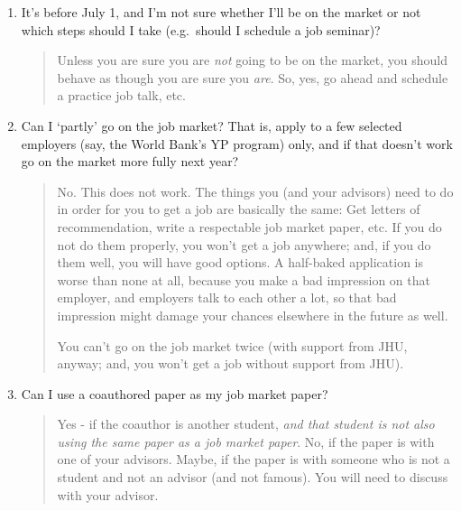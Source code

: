\documentclass{\classes/econtex}
\begin{document}
\begin{enumerate}
\begin{quote}
\begin{comment}
    \end{comment}


  \end{quote}
\item It's before July 1, and I'm not sure whether I'll be on the market or not which steps should I take (e.g.\ should I schedule a job seminar)?

  \begin{quote}
    Unless you are sure you are \textit{not} going to be on the market, you should behave as though you are sure you \textit{are}.  So, yes, go ahead and schedule a practice job talk, etc.

  \end{quote}
\item  Can I `partly' go on the job market?  That is, apply to a few
  selected employers (say, the World Bank's YP program) only, and 
  if that doesn't work go on the market more fully next year?

  \begin{quote}
    No.  This does not work.  The things you (and your advisors) need to do in order for you to
    get a job are basically the same: Get letters of recommendation, 
    write a respectable job market paper, etc.  If you do not do them
    properly, you won't get a job anywhere; and, if you do them well,
    you will have good options.  A half-baked application is worse than
    none at all, because you make a bad impression on that employer, and 
    employers talk to each other a lot, so that bad impression might damage
    your chances elsewhere in the future as well.  

    You can't go on the job market twice (with support from JHU, anyway; and, you won't
    get a job without support from JHU).

  \end{quote}
\item  Can I use a coauthored paper as my job market paper?

  \begin{quote}
    Yes - if the coauthor is another student, \textit{and that student is not
    also using the same paper as a job market paper}.  No, if the paper is with one of your
    advisors.  Maybe, if the paper is with someone who is not a student
    and not an advisor (and not famous).  You will need to discuss with your advisor.
    \hypertarget{Where-Should-I-Look-for-Jobs}{}

  \end{quote}


\end{enumerate}
\end{document}
